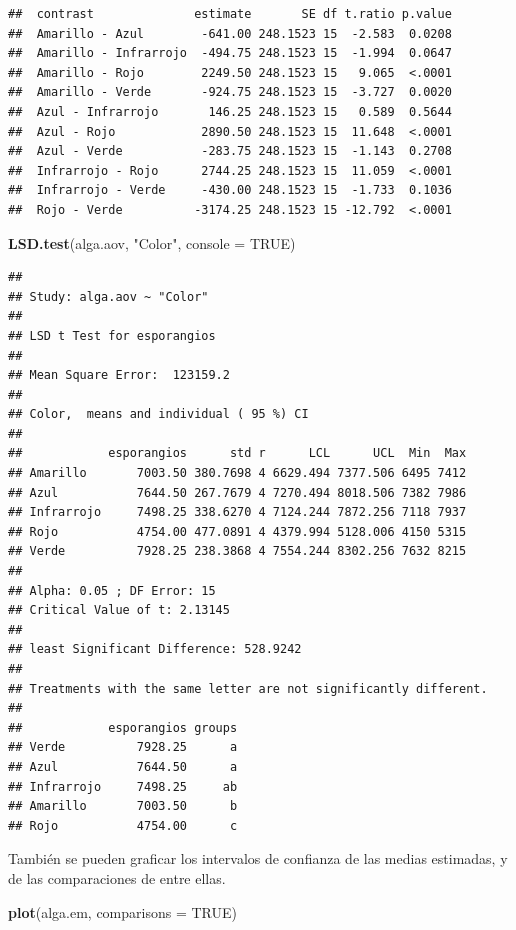 \documentclass[]{book}
\newenvironment{Shaded}{\begin{snugshade}}{\end{snugshade}}
\newcommand{\DataTypeTok}[1]{\textcolor[rgb]{0.13,0.29,0.53}{#1}}
\newcommand{\KeywordTok}[1]{\textcolor[rgb]{0.13,0.29,0.53}{\textbf{#1}}}
\newcommand{\NormalTok}[1]{#1}
\newcommand{\OtherTok}[1]{\textcolor[rgb]{0.56,0.35,0.01}{#1}}
\newcommand{\StringTok}[1]{\textcolor[rgb]{0.31,0.60,0.02}{#1}}
\theoremstyle{definition}
\theoremstyle{definition}
\theoremstyle{definition}
\theoremstyle{remark}
\begin{document}
\begin{verbatim}
##  contrast              estimate       SE df t.ratio p.value
##  Amarillo - Azul        -641.00 248.1523 15  -2.583  0.0208
##  Amarillo - Infrarrojo  -494.75 248.1523 15  -1.994  0.0647
##  Amarillo - Rojo        2249.50 248.1523 15   9.065  <.0001
##  Amarillo - Verde       -924.75 248.1523 15  -3.727  0.0020
##  Azul - Infrarrojo       146.25 248.1523 15   0.589  0.5644
##  Azul - Rojo            2890.50 248.1523 15  11.648  <.0001
##  Azul - Verde           -283.75 248.1523 15  -1.143  0.2708
##  Infrarrojo - Rojo      2744.25 248.1523 15  11.059  <.0001
##  Infrarrojo - Verde     -430.00 248.1523 15  -1.733  0.1036
##  Rojo - Verde          -3174.25 248.1523 15 -12.792  <.0001
\end{verbatim}

\begin{Shaded}
\begin{Highlighting}[]
\KeywordTok{LSD.test}\NormalTok{(alga.aov, }\StringTok{"Color"}\NormalTok{, }\DataTypeTok{console =} \OtherTok{TRUE}\NormalTok{)}
\end{Highlighting}
\end{Shaded}

\begin{verbatim}
## 
## Study: alga.aov ~ "Color"
## 
## LSD t Test for esporangios 
## 
## Mean Square Error:  123159.2 
## 
## Color,  means and individual ( 95 %) CI
## 
##            esporangios      std r      LCL      UCL  Min  Max
## Amarillo       7003.50 380.7698 4 6629.494 7377.506 6495 7412
## Azul           7644.50 267.7679 4 7270.494 8018.506 7382 7986
## Infrarrojo     7498.25 338.6270 4 7124.244 7872.256 7118 7937
## Rojo           4754.00 477.0891 4 4379.994 5128.006 4150 5315
## Verde          7928.25 238.3868 4 7554.244 8302.256 7632 8215
## 
## Alpha: 0.05 ; DF Error: 15
## Critical Value of t: 2.13145 
## 
## least Significant Difference: 528.9242 
## 
## Treatments with the same letter are not significantly different.
## 
##            esporangios groups
## Verde          7928.25      a
## Azul           7644.50      a
## Infrarrojo     7498.25     ab
## Amarillo       7003.50      b
## Rojo           4754.00      c
\end{verbatim}

También se pueden graficar los intervalos de confianza de las medias
estimadas, y de las comparaciones de entre ellas.

\begin{Shaded}
\begin{Highlighting}[]
\KeywordTok{plot}\NormalTok{(alga.em, }\DataTypeTok{comparisons =} \OtherTok{TRUE}\NormalTok{)}
\end{Highlighting}
\end{Shaded}
\end{document}
